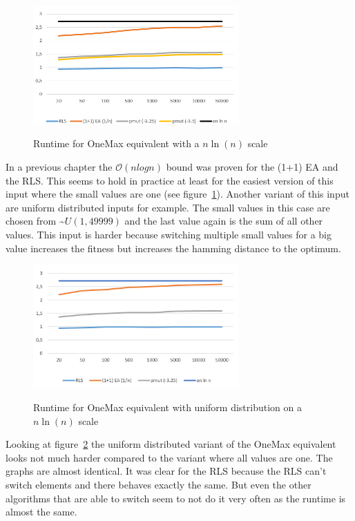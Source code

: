 \begin{figure}[h]
      \caption{Runtime for OneMax equivalent with a $n\ln(n)$ scale}
      \centering
      \includegraphics[width=0.7\textwidth]{figures/images/oneMaxMultipleN.png}\label{fig:onemaxNlogNBound}
\end{figure}

In a previous chapter the $\mathcal{O}(nlogn)$ bound was proven for the (1+1) EA and the RLS.
This seems to hold in practice at least for the easiest version of this input where the small values are one (see figure~\ref{fig:onemaxNlogNBound}).
Another variant of this input are uniform distributed inputs for example.
The small values in this case are chosen from \textasciitilde$U(1,49999)$ and the last value again is the sum of all other values.
This input is harder because switching multiple small values for a big value increases the fitness but increases the hamming distance to the optimum.

\begin{figure}[h]
      \caption{Runtime for OneMax equivalent with uniform distribution on a $n\ln(n)$ scale}
      \centering
      \includegraphics[width=0.7\textwidth]{figures/images/oneMaxUniformMultipleN.png}\label{fig:onemaxUniformNlogNBound}
\end{figure}

Looking at figure~\ref{fig:onemaxUniformNlogNBound} the uniform distributed variant of the OneMax equivalent looks not much harder compared to the variant where all values are one.
The graphs are almost identical.
It was clear for the RLS because the RLS can't switch elements and there behaves exactly the same.
But even the other algorithms that are able to switch seem to not do it very often as the runtime is almost the same.